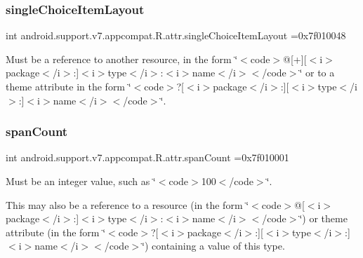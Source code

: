 \subsubsection{\texorpdfstring{single\+Choice\+Item\+Layout}{singleChoiceItemLayout}}
{\footnotesize\ttfamily int android.\+support.\+v7.\+appcompat.\+R.\+attr.\+single\+Choice\+Item\+Layout =0x7f010048\hspace{0.3cm}{\ttfamily [static]}}

Must be a reference to another resource, in the form \char`\"{}$<$code$>$@\mbox{[}+\mbox{]}\mbox{[}$<$i$>$package$<$/i$>$\+:\mbox{]}$<$i$>$type$<$/i$>$\+:$<$i$>$name$<$/i$>$$<$/code$>$\char`\"{} or to a theme attribute in the form \char`\"{}$<$code$>$?\mbox{[}$<$i$>$package$<$/i$>$\+:\mbox{]}\mbox{[}$<$i$>$type$<$/i$>$\+:\mbox{]}$<$i$>$name$<$/i$>$$<$/code$>$\char`\"{}. \mbox{\label{classandroid_1_1support_1_1v7_1_1appcompat_1_1R_1_1attr_a09556cbb116dcc82ef3b65a9d4b55d8c}} 
\subsubsection{\texorpdfstring{span\+Count}{spanCount}}
{\footnotesize\ttfamily int android.\+support.\+v7.\+appcompat.\+R.\+attr.\+span\+Count =0x7f010001\hspace{0.3cm}{\ttfamily [static]}}

Must be an integer value, such as \char`\"{}$<$code$>$100$<$/code$>$\char`\"{}. 

This may also be a reference to a resource (in the form \char`\"{}$<$code$>$@\mbox{[}$<$i$>$package$<$/i$>$\+:\mbox{]}$<$i$>$type$<$/i$>$\+:$<$i$>$name$<$/i$>$$<$/code$>$\char`\"{}) or theme attribute (in the form \char`\"{}$<$code$>$?\mbox{[}$<$i$>$package$<$/i$>$\+:\mbox{]}\mbox{[}$<$i$>$type$<$/i$>$\+:\mbox{]}$<$i$>$name$<$/i$>$$<$/code$>$\char`\"{}) containing a value of this type. \mbox{\label{classandroid_1_1support_1_1v7_1_1appcompat_1_1R_1_1attr_a691f13c5cbd10190f66459c7744ea5f0}} 

